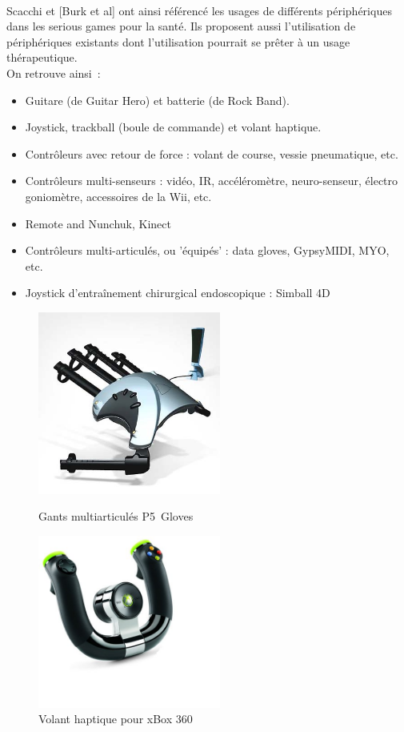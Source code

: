 \paragraph{} Scacchi\cite{Scac11} et [Burk et al]\cite{Burk09} ont ainsi référencé les usages de différents périphériques dans les serious games pour la santé. Ils proposent aussi l'utilisation de périphériques existants dont l'utilisation pourrait se prêter à un usage thérapeutique. \\
On retrouve ainsi~:
\begin{itemize}
	\item Guitare (de Guitar Hero) et batterie (de Rock Band).
	\item Joystick, trackball (boule de commande) et volant haptique.
	\item Contrôleurs avec retour de force : volant de course, vessie pneumatique, etc.
	\item Contrôleurs multi-senseurs : vidéo, IR, accéléromètre, neuro-senseur, électro goniomètre, accessoires de la Wii, etc.
	\item Remote and Nunchuk, Kinect
	\item Contrôleurs multi-articulés, ou 'équipés' : data gloves, GypsyMIDI, MYO, etc.
	\item Joystick d’entraînement chirurgical endoscopique : Simball 4D
\end{itemize}

\begin{figure}
	\begin{minipage}{0.49\linewidth}
		\centering
		\includegraphics[width=6cm]{images/p5_gloves.jpg}
		\caption{Gants multiarticulés P5~Gloves}
		\label{p5gloves}
	\end{minipage}
	\begin{minipage}{0.49\linewidth}
		\centering
		\includegraphics[width=6cm]{images/volant_haptique.jpg}
		\caption{Volant haptique pour xBox 360}
		\label{volant_haptique}
	\end{minipage}
\end{figure}

